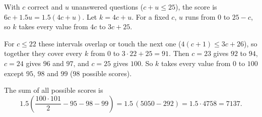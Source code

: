 With $c$ correct and $u$ unanswered questions ($c+u\le25$), the score is $6c+1.5u=1.5(4c+u)$. Let $k=4c+u$. For a fixed $c$, $u$ runs from $0$ to $25-c$, so $k$ takes every value from $4c$ to $3c+25$.

For $c\le22$ these intervals overlap or touch the next one ($4(c+1)\le3c+26$), so together they cover every $k$ from $0$ to $3\cdot22+25=91$. Then $c=23$ gives $92$ to $94$, $c=24$ gives $96$ and $97$, and $c=25$ gives $100$. So $k$ takes every value from $0$ to $100$ except $95$, $98$ and $99$ ($98$ possible scores).

The sum of all possible scores is
\[1.5\left(\dfrac{100\cdot101}{2}-95-98-99\right)=1.5\,(5050-292)=1.5\cdot4758=\boxed{7137}.\]
